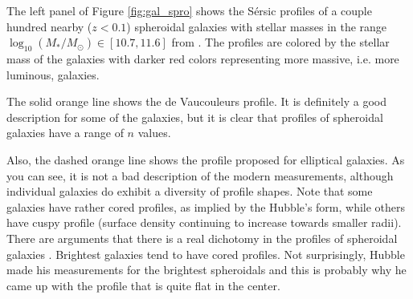 The left panel of Figure \ref{fig:gal_spro} shows  the S\'ersic profiles of a couple hundred nearby ($z<0.1$) spheroidal galaxies with stellar masses in the range
$\log_{10}(M_*/M_\odot)\in [10.7, 11.6]$ from \href{http://adsabs.harvard.edu/abs/2013ApJ...763...73S}{\citet{szomoru_etal13}}.
The profiles are colored by the stellar mass of the galaxies with darker red colors representing more massive, i.e. more luminous, galaxies. 

The solid orange line shows the de Vaucouleurs profile. It is definitely a good description for some of the galaxies, but it is clear that profiles of spheroidal galaxies have a range of $n$ values. 

Also, the dashed orange line shows the profile \href{http://adsabs.harvard.edu/abs/1930ApJ....71..231H}{\citet{hubble30}} proposed for elliptical galaxies. As you can see, it is not a bad description of the modern measurements, although individual galaxies do exhibit a diversity of profile shapes. Note that some galaxies have rather cored profiles, as implied by the Hubble's form, while others have cuspy profile (surface density continuing to increase towards smaller radii). There are arguments that there is a real dichotomy in the profiles of spheroidal galaxies \href{http://adsabs.harvard.edu/abs/1997AJ....114.1771F}{\citep[e.g.,][]{faber_etal97}}. 
Brightest galaxies tend to have cored profiles. Not surprisingly, Hubble made his measurements for the brightest spheroidals and this is probably why he came up with the profile that is quite flat in the center. 

